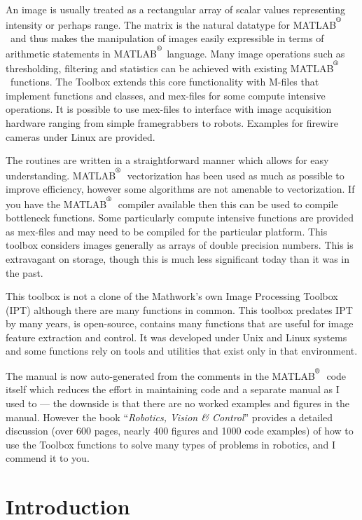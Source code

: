 \documentclass[a4paper]{report}
\def\Mlab{MATLAB$^{\textsuperscript{\textregistered}}$}
\begin{document}
An image is usually treated as a rectangular array of scalar values representing
intensity or perhaps range.
The matrix is the natural datatype for \Mlab\ and thus makes the manipulation
of images easily expressible in terms of arithmetic statements in \Mlab
language.
Many image operations such as thresholding, filtering and statistics can
be achieved with existing \Mlab\ functions.
The Toolbox extends this core functionality with M-files that
implement functions and classes, and mex-files for some compute
intensive operations.
It is possible to use mex-files to interface with image acquisition
hardware ranging from simple framegrabbers to robots.
Examples for firewire cameras under Linux are provided.

The routines are written in a straightforward manner which allows
for easy understanding.  \Mlab\ vectorization has been used as much as
possible to improve efficiency, however some algorithms are not amenable
to vectorization.
If you have the \Mlab\ compiler available then this can be used to compile
bottleneck functions.
Some particularly compute intensive functions are provided as mex-files and
may need to be compiled for the particular platform.
This toolbox considers images generally as arrays of double precision
numbers.  This is extravagant on storage, though this is much less
significant today than it was in the past.

This toolbox is not a clone of the Mathwork's own Image Processing 
Toolbox (IPT) although there are many functions in common.
This toolbox predates IPT by many years, is open-source, contains many 
functions that are useful for image feature extraction and control.
It was developed under Unix and Linux systems and some functions
rely on tools and utilities that exist only in that environment.

The manual is now auto-generated from the comments in the \Mlab\ code itself which reduces the effort
in maintaining code and a separate manual as I used to --- the downside is that there are no worked examples and figures in the manual.
However the book ``\textit{Robotics, Vision \& Control}''  provides a detailed discussion (over 600 pages, nearly 400 figures and 1000 code examples)
of how to use the Toolbox functions to
solve many types of problems in robotics, and I commend it to you.


\newpage
\tableofcontents
\newpage
\chapter{Introduction}
\end{document}
